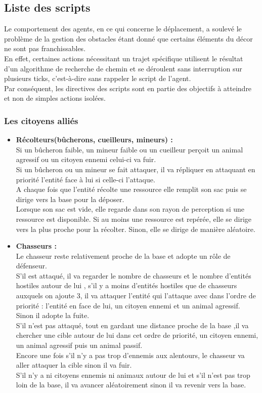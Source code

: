 \documentclass[a4paper]{memoir}
\begin{document}
			\subsection{Liste des scripts}
				Le comportement des agents, en ce qui concerne le déplacement, a soulevé le problème de la gestion des obstacles étant donné que certains éléments du décor ne sont pas franchissables.\\
				En effet, certaines actions nécessitant un trajet spécifique utilisent le résultat d'un algorithme de recherche de chemin et se déroulent sans interruption sur plusieurs ticks, c'est-à-dire sans rappeler le script de l'agent.\\
				Par conséquent, les directives des scripts sont en partie des objectifs à atteindre et non de simples actions isolées.
	
				\subsubsection{Les citoyens alliés}
					\begin{itemize}[label=$\bullet$]
						\item \textbf{Récolteurs(bûcherons, cueilleurs, mineurs) :} \\ Si un bûcheron faible, un mineur faible ou un cueilleur perçoit un animal agressif ou un citoyen ennemi celui-ci va fuir.\\
							Si un bûcheron ou un mineur se fait attaquer, il va répliquer en attaquant en priorité l'entité face à lui si celle-ci l'attaque.\\
							A chaque fois que l'entité récolte une ressource elle remplit son sac puis se dirige vers la base pour la déposer.\\
							Lorsque son sac est vide, elle regarde dans son rayon de perception si une ressource est disponible. Si au moins une ressource est repérée, elle se dirige vers la plus proche pour la récolter. Sinon, elle se dirige de manière aléatoire.
						\item \textbf{Chasseurs :} \\ Le chasseur reste relativement proche de la base et adopte un rôle de défenseur.\\
							S'il est attaqué, il va regarder le nombre de chasseurs et le nombre d'entités hostiles autour de lui , s'il y a moins d'entités hostiles que de chasseurs auxquels on ajoute 3, il va attaquer l'entité qui l'attaque avec dans l'ordre de priorité : l'entité en face de lui, un citoyen ennemi et un animal agressif. Sinon il adopte la fuite.\\
							S'il n'est pas attaqué, tout en gardant une distance proche de la base ,il va chercher une cible autour de lui dans cet ordre de priorité, un citoyen ennemi, un animal agressif puis un animal passif.\\
							Encore une fois s'il n'y a pas trop d'ennemis aux alentours, le chasseur va aller attaquer la cible sinon il va fuir.\\
							S'il n'y a ni citoyens ennemis ni animaux autour de lui et s'il n'est pas trop loin de la base, il va avancer aléatoirement sinon il va revenir vers la base.
					\end{itemize}
		
\end{document}
